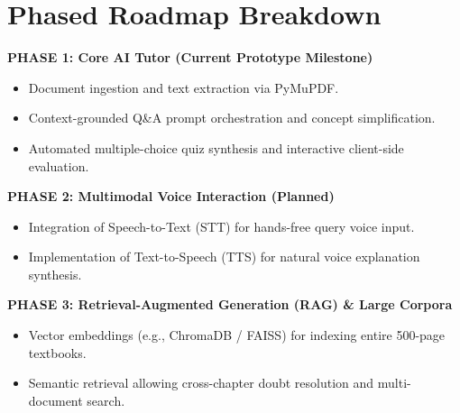 \documentclass[11pt,a4paper]{report}
\begin{document}
\section{Phased Roadmap Breakdown}

\begin{mdframed}[linecolor=icemTeal, backgroundcolor=cardBg, innerleftmargin=10pt, innerrightmargin=10pt, innertopmargin=8pt, innerbottommargin=8pt]
\textbf{\color{icemNavy}PHASE 1: Core AI Tutor (Current Prototype Milestone)}
\begin{itemize}[noitemsep, topsep=2pt]
    \item Document ingestion and text extraction via PyMuPDF.
    \item Context-grounded Q\&A prompt orchestration and concept simplification.
    \item Automated multiple-choice quiz synthesis and interactive client-side evaluation.
\end{itemize}
\end{mdframed}

\begin{mdframed}[linecolor=borderColor, backgroundcolor=white, innerleftmargin=10pt, innerrightmargin=10pt, innertopmargin=8pt, innerbottommargin=8pt]
\textbf{\color{icemNavy}PHASE 2: Multimodal Voice Interaction (Planned)}
\begin{itemize}[noitemsep, topsep=2pt]
    \item Integration of Speech-to-Text (STT) for hands-free query voice input.
    \item Implementation of Text-to-Speech (TTS) for natural voice explanation synthesis.
\end{itemize}
\end{mdframed}

\begin{mdframed}[linecolor=borderColor, backgroundcolor=white, innerleftmargin=10pt, innerrightmargin=10pt, innertopmargin=8pt, innerbottommargin=8pt]
\textbf{\color{icemNavy}PHASE 3: Retrieval-Augmented Generation (RAG) \& Large Corpora}
\begin{itemize}[noitemsep, topsep=2pt]
    \item Vector embeddings (e.g., ChromaDB / FAISS) for indexing entire 500-page textbooks.
    \item Semantic retrieval allowing cross-chapter doubt resolution and multi-document search.
\end{itemize}
\end{mdframed}
\end{document}
